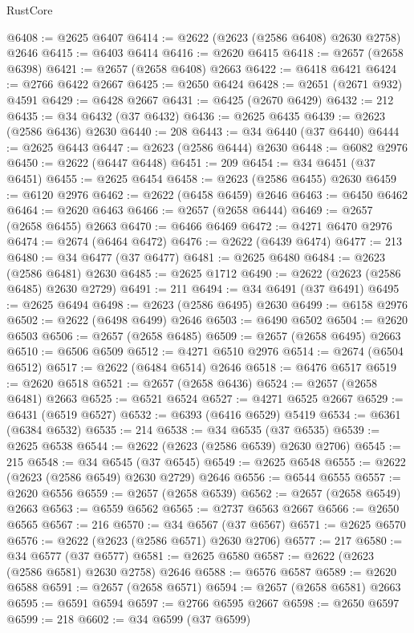 \begin{lexlean}{RustCore}
\begin{coremodule}
@6408 := @2625 @6407
@6414 := @2622 (@2623 (@2586 @6408) @2630 @2758) @2646
@6415 := @6403 @6414
@6416 := @2620 @6415
@6418 := @2657 (@2658 @6398)
@6421 := @2657 (@2658 @6408) @2663
@6422 := @6418 @6421
@6424 := @2766 @6422 @2667
@6425 := @2650 @6424
@6428 := @2651 (@2671 @932) @4591
@6429 := @6428 @2667
@6431 := @6425 (@2670 @6429)
@6432 := 212
@6435 := @34 @6432 (@37 @6432)
@6436 := @2625 @6435
@6439 := @2623 (@2586 @6436) @2630
@6440 := 208
@6443 := @34 @6440 (@37 @6440)
@6444 := @2625 @6443
@6447 := @2623 (@2586 @6444) @2630
@6448 := @6082 @2976
@6450 := @2622 (@6447 @6448)
@6451 := 209
@6454 := @34 @6451 (@37 @6451)
@6455 := @2625 @6454
@6458 := @2623 (@2586 @6455) @2630
@6459 := @6120 @2976
@6462 := @2622 (@6458 @6459) @2646
@6463 := @6450 @6462
@6464 := @2620 @6463
@6466 := @2657 (@2658 @6444)
@6469 := @2657 (@2658 @6455) @2663
@6470 := @6466 @6469
@6472 := @4271 @6470 @2976
@6474 := @2674 (@6464 @6472)
@6476 := @2622 (@6439 @6474)
@6477 := 213
@6480 := @34 @6477 (@37 @6477)
@6481 := @2625 @6480
@6484 := @2623 (@2586 @6481) @2630
@6485 := @2625 @1712
@6490 := @2622 (@2623 (@2586 @6485) @2630 @2729)
@6491 := 211
@6494 := @34 @6491 (@37 @6491)
@6495 := @2625 @6494
@6498 := @2623 (@2586 @6495) @2630
@6499 := @6158 @2976
@6502 := @2622 (@6498 @6499) @2646
@6503 := @6490 @6502
@6504 := @2620 @6503
@6506 := @2657 (@2658 @6485)
@6509 := @2657 (@2658 @6495) @2663
@6510 := @6506 @6509
@6512 := @4271 @6510 @2976
@6514 := @2674 (@6504 @6512)
@6517 := @2622 (@6484 @6514) @2646
@6518 := @6476 @6517
@6519 := @2620 @6518
@6521 := @2657 (@2658 @6436)
@6524 := @2657 (@2658 @6481) @2663
@6525 := @6521 @6524
@6527 := @4271 @6525 @2667
@6529 := @6431 (@6519 @6527)
@6532 := @6393 (@6416 @6529) @5419
@6534 := @6361 (@6384 @6532)
@6535 := 214
@6538 := @34 @6535 (@37 @6535)
@6539 := @2625 @6538
@6544 := @2622 (@2623 (@2586 @6539) @2630 @2706)
@6545 := 215
@6548 := @34 @6545 (@37 @6545)
@6549 := @2625 @6548
@6555 := @2622 (@2623 (@2586 @6549) @2630 @2729) @2646
@6556 := @6544 @6555
@6557 := @2620 @6556
@6559 := @2657 (@2658 @6539)
@6562 := @2657 (@2658 @6549) @2663
@6563 := @6559 @6562
@6565 := @2737 @6563 @2667
@6566 := @2650 @6565
@6567 := 216
@6570 := @34 @6567 (@37 @6567)
@6571 := @2625 @6570
@6576 := @2622 (@2623 (@2586 @6571) @2630 @2706)
@6577 := 217
@6580 := @34 @6577 (@37 @6577)
@6581 := @2625 @6580
@6587 := @2622 (@2623 (@2586 @6581) @2630 @2758) @2646
@6588 := @6576 @6587
@6589 := @2620 @6588
@6591 := @2657 (@2658 @6571)
@6594 := @2657 (@2658 @6581) @2663
@6595 := @6591 @6594
@6597 := @2766 @6595 @2667
@6598 := @2650 @6597
@6599 := 218
@6602 := @34 @6599 (@37 @6599)

\end{coremodule}
\end{lexlean}
